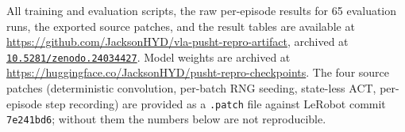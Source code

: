 \documentclass[11pt]{article}
\begin{document}
\begin{sloppypar}

All training and evaluation scripts, the raw per-episode results for 65 evaluation
runs, the exported source patches, and the result tables are available at
\url{https://github.com/JacksonHYD/vla-pusht-repro-artifact}, archived at
\href{https://doi.org/10.5281/zenodo.24034427}{\nolinkurl{10.5281/zenodo.24034427}}. Model weights are
archived at \url{https://huggingface.co/JacksonHYD/pusht-repro-checkpoints}. The
four source patches (deterministic convolution, per-batch RNG seeding, state-less
ACT, per-episode step recording) are provided as a \texttt{.patch} file against
LeRobot commit \texttt{7e241bd6}; without them the numbers below are not
reproducible.

\end{sloppypar}
\end{document}

